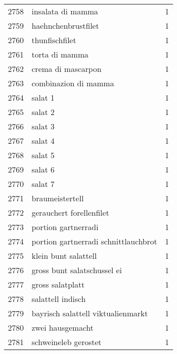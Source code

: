 \begin{tabular}{llr}
2758 &                                  insalata di mamma &      1 \\
2759 &                                haehnchenbrustfilet &      1 \\
2760 &                                     thunfischfilet &      1 \\
2761 &                                     torta di mamma &      1 \\
2762 &                                 crema di mascarpon &      1 \\
2763 &                               combinazion di mamma &      1 \\
2764 &                                            salat 1 &      1 \\
2765 &                                            salat 2 &      1 \\
2766 &                                            salat 3 &      1 \\
2767 &                                            salat 4 &      1 \\
2768 &                                            salat 5 &      1 \\
2769 &                                            salat 6 &      1 \\
2770 &                                            salat 7 &      1 \\
2771 &                                    braumeistertell &      1 \\
2772 &                           gerauchert forellenfilet &      1 \\
2773 &                                portion gartnerradi &      1 \\
2774 &               portion gartnerradi schnittlauchbrot &      1 \\
2775 &                               klein bunt salattell &      1 \\
2776 &                        gross bunt salatschussel ei &      1 \\
2777 &                                   gross salatplatt &      1 \\
2778 &                                  salattell indisch &      1 \\
2779 &                 bayrisch salattell viktualienmarkt &      1 \\
2780 &                                   zwei hausgemacht &      1 \\
2781 &                               schweineleb gerostet &      1 \\

\end{tabular}
